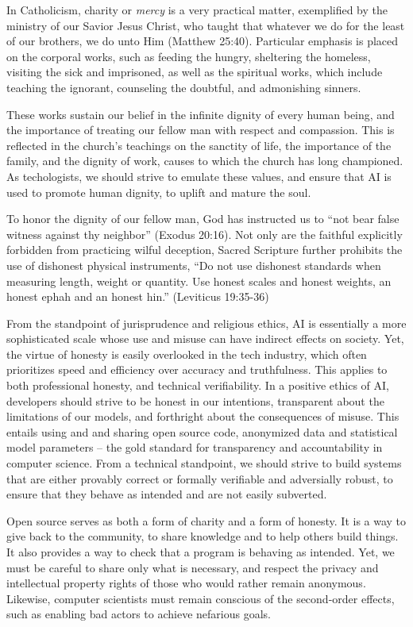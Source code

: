 \documentclass[sigplan,nonacm]{acmart}\settopmatter{printfolios=false,printccs=false,printacmref=false}
\begin{document}
  In Catholicism, charity or \textit{mercy} is a very practical matter, exemplified by the ministry of our Savior Jesus Christ, who taught that whatever we do for the least of our brothers, we do unto Him (Matthew 25:40). Particular emphasis is placed on the corporal works, such as feeding the hungry, sheltering the homeless, visiting the sick and imprisoned, as well as the spiritual works, which include teaching the ignorant, counseling the doubtful, and admonishing sinners.

  These works sustain our belief in the infinite dignity of every human being, and the importance of treating our fellow man with respect and compassion. This is reflected in the church's teachings on the sanctity of life, the importance of the family, and the dignity of work, causes to which the church has long championed. As techologists, we should strive to emulate these values, and ensure that AI is used to promote human dignity, to uplift and mature the soul.

  To honor the dignity of our fellow man, God has instructed us to ``not bear false witness against thy neighbor'' (Exodus 20:16). Not only are the faithful explicitly forbidden from practicing wilful deception, Sacred Scripture further prohibits the use of dishonest physical instruments, ``Do not use dishonest standards when measuring length, weight or quantity. Use honest scales and honest weights, an honest ephah and an honest hin.'' (Leviticus 19:35-36)

  From the standpoint of jurisprudence and religious ethics, AI is essentially a more sophisticated scale whose use and misuse can have indirect effects on society. Yet, the virtue of honesty is easily overlooked in the tech industry, which often prioritizes speed and efficiency over accuracy and truthfulness. This applies to both professional honesty, and technical verifiability. In a positive ethics of AI, developers should strive to be honest in our intentions, transparent about the limitations of our models, and forthright about the consequences of misuse. This entails using and and sharing open source code, anonymized data and statistical model parameters -- the gold standard for transparency and accountability in computer science. From a technical standpoint, we should strive to build systems that are either provably correct or formally verifiable and adversially robust, to ensure that they behave as intended and are not easily subverted.

  Open source serves as both a form of charity and a form of honesty. It is a way to give back to the community, to share knowledge and to help others build things. It also provides a way to check that a program is behaving as intended. Yet, we must be careful to share only what is necessary, and respect the privacy and intellectual property rights of those who would rather remain anonymous. Likewise, computer scientists must remain conscious of the second-order effects, such as enabling bad actors to achieve nefarious goals.
\end{document}
